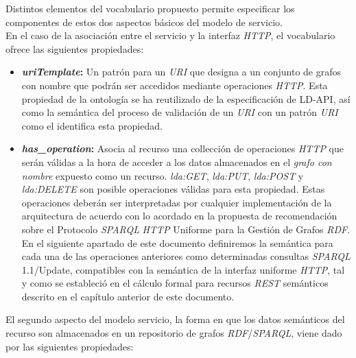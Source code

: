 Distintos elementos del vocabulario propuesto permite especificar los componentes de estos dos aspectos b\'asicos del modelo de servicio.\\
En el caso de la asociaci\'on entre el servicio y la interfaz \textit{HTTP}, el vocabulario ofrece las siguientes propiedades:

\begin{itemize}

\item \textbf{\textit{uriTemplate}:} Un patr\'on para un \textit{URI} que designa a un conjunto de grafos con nombre que podr\'an ser accedidos mediante operaciones \textit{HTTP}.  Esta propiedad de la ontolog\'ia se ha reutilizado de la especificaci\'on de LD-API, as\'i como la sem\'antica del proceso de validaci\'on de un \textit{URI} con un patr\'on \textit{URI} como el identifica esta propiedad.
\item \textbf{\textit{has\_operation}:} Asocia al recurso una collecci\'on de operaciones \textit{HTTP} que ser\'an v\'alidas a la hora de acceder a los datos almacenados en el \textit{grafo con nombre} expuesto como un recurso. \textit{lda:GET}, \textit{lda:PUT}, \textit{lda:POST} y \textit{lda:DELETE} son posible operaciones v\'alidas para esta propiedad. Estas operaciones deber\'an ser interpretadas por cualquier implementaci\'on de la arquitectura de acuerdo con lo acordado en la propuesta de recomendaci\'on sobre el Protocolo \textit{SPARQL} \textit{HTTP} Uniforme para la Gesti\'on de Grafos \textit{RDF}. En el siguiente apartado de este documento definiremos la sem\'antica para cada una de las operaciones anteriores como determinadas consultas \textit{SPARQL} 1.1/Update, compatibles con la sem\'antica de la interfaz uniforme \textit{HTTP}, tal y como se estableci\'o en el c\'alculo formal para recursos \textit{REST} sem\'anticos descrito en el cap\'itulo anterior de este documento.

\end{itemize}

El segundo aspecto del modelo servicio, la forma en que los datos sem\'anticos del recurso son almacenados en un repositorio de grafos \textit{RDF}/\textit{SPARQL}, viene dado por las siguientes propiedades:

